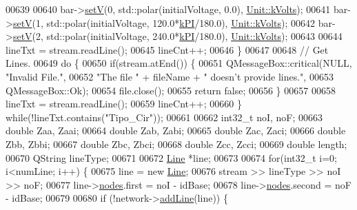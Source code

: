 \begin{DoxyCode}
00639 
00640     bar->\hyperlink{group___models_ga8d1e70b2d11ed4245e81b8b20858079d}{setV}(0, std::polar(initialVoltage, 0.0), \hyperlink{class_unit_a55b07dfa9457e1eca2c7194fe0cfc3c1aa54b2473993a702a3923525765bd6e4c}{Unit::kVolts});
00641     bar->\hyperlink{group___models_ga8d1e70b2d11ed4245e81b8b20858079d}{setV}(1, std::polar(initialVoltage, 120.0*\hyperlink{math__constants_8h_a368d99984512d9a6c6f18b37b4446431}{kPI}/180.0), 
      \hyperlink{class_unit_a55b07dfa9457e1eca2c7194fe0cfc3c1aa54b2473993a702a3923525765bd6e4c}{Unit::kVolts});
00642     bar->\hyperlink{group___models_ga8d1e70b2d11ed4245e81b8b20858079d}{setV}(2, std::polar(initialVoltage, 240.0*\hyperlink{math__constants_8h_a368d99984512d9a6c6f18b37b4446431}{kPI}/180.0), 
      \hyperlink{class_unit_a55b07dfa9457e1eca2c7194fe0cfc3c1aa54b2473993a702a3923525765bd6e4c}{Unit::kVolts});
00643 
00644     lineTxt = stream.readLine();
00645     lineCnt++;
00646   \}
00647 
00648   \textcolor{comment}{// Get Lines.}
00649   \textcolor{keywordflow}{do} \{
00650     \textcolor{keywordflow}{if}(stream.atEnd()) \{
00651       QMessageBox::critical(NULL, \textcolor{stringliteral}{"Invalid File."},
00652                             \textcolor{stringliteral}{"The file "} + fileName + \textcolor{stringliteral}{" doesn't provide lines."},
00653                             QMessageBox::Ok);
00654       file.close();
00655       \textcolor{keywordflow}{return} \textcolor{keyword}{false};
00656     \}
00657 
00658     lineTxt = stream.readLine();
00659     lineCnt++;
00660   \} \textcolor{keywordflow}{while}(!lineTxt.contains(\textcolor{stringliteral}{"Tipo\_Cir"}));
00661 
00662   int32\_t noI, noF;
00663   \textcolor{keywordtype}{double} Zaa, Zaai;
00664   \textcolor{keywordtype}{double} Zab, Zabi;
00665   \textcolor{keywordtype}{double} Zac, Zaci;
00666   \textcolor{keywordtype}{double} Zbb, Zbbi;
00667   \textcolor{keywordtype}{double} Zbc, Zbci;
00668   \textcolor{keywordtype}{double} Zcc, Zcci;
00669   \textcolor{keywordtype}{double} length;
00670   QString lineType;
00671 
00672   \hyperlink{class_line}{Line} *line;
00673 
00674   \textcolor{keywordflow}{for}(int32\_t i=0; i<numLine; i++) \{
00675     line = \textcolor{keyword}{new} \hyperlink{class_line}{Line};
00676     stream >> lineType >> noI >> noF;
00677     line->\hyperlink{class_line_afd17c40d656e6a8d677cb22df5f0c70b}{nodes}.first = noI - idBase;
00678     line->\hyperlink{class_line_afd17c40d656e6a8d677cb22df5f0c70b}{nodes}.second = noF - idBase;
00679 
00680     \textcolor{keywordflow}{if} (!network->\hyperlink{group___models_gae02945131494987b3ff9b59b627719b4}{addLine}(line)) \{

\end{DoxyCode}
